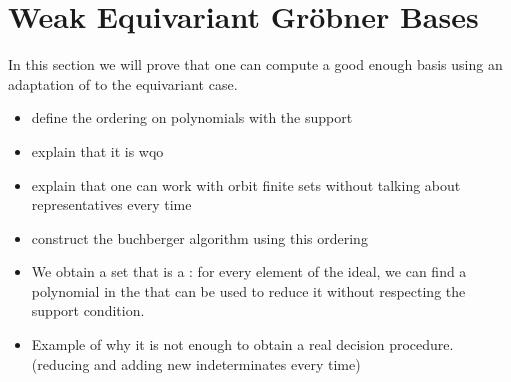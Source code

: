 \section{Weak Equivariant Gröbner Bases}
\label{sec:weakgb}

\AP In this section we will prove that one can compute a good enough basis
using an adaptation of  to the equivariant case.

\begin{itemize}
  \item define the ordering on polynomials with the support
  \item explain that it is wqo
  \item explain that one can work with orbit finite sets
    without talking about representatives every time
  \item construct the buchberger algorithm using this ordering
  \item We obtain a set that is a :
    for every element of the ideal, we can find a polynomial in the
     that can be used to reduce it without
    respecting the support condition.
  \item Example of why it is not enough to obtain a real 
    decision procedure.
  (reducing and adding new indeterminates every time)
\end{itemize}

